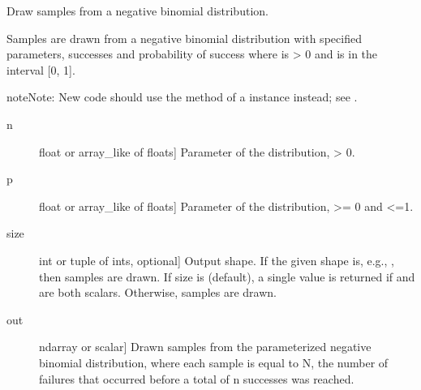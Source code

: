 \documentclass[letterpaper,10pt,english]{sphinxmanual}
\begin{document}

\begin{fulllineitems}
\label{\detokenize{infrapy.utils:infrapy.utils.ref2sac.negative_binomial}}
Draw samples from a negative binomial distribution.

Samples are drawn from a negative binomial distribution with specified
parameters,  successes and  probability of success where 
is \textgreater{} 0 and  is in the interval {[}0, 1{]}.

\begin{sphinxadmonition}{note}{Note:}
New code should use the  method of a 
instance instead; see .
\end{sphinxadmonition}
\begin{description}
\item[{n}] \leavevmode{[}float or array\_like of floats{]}
Parameter of the distribution, \textgreater{} 0.

\item[{p}] \leavevmode{[}float or array\_like of floats{]}
Parameter of the distribution, \textgreater{}= 0 and \textless{}=1.

\item[{size}] \leavevmode{[}int or tuple of ints, optional{]}
Output shape.  If the given shape is, e.g., , then
 samples are drawn.  If size is  (default),
a single value is returned if  and  are both scalars.
Otherwise,  samples are drawn.

\end{description}
\begin{description}
\item[{out}] \leavevmode{[}ndarray or scalar{]}
Drawn samples from the parameterized negative binomial distribution,
where each sample is equal to N, the number of failures that
occurred before a total of n successes was reached.


\end{description}
\end{fulllineitems}
\end{document}

